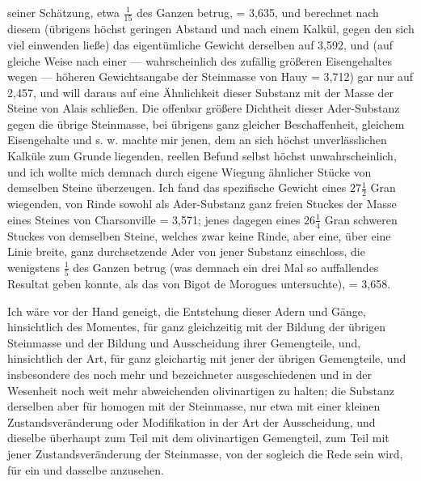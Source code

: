 \documentclass[a4paper, 11pt, oneside, german]{article}
\begin{document}
{seiner Schätzung, etwa $\frac{1}{15}$ des Ganzen betrug, = 3,635, und berechnet nach diesem (übrigens höchst geringen Abstand und nach einem Kalkül, gegen den sich viel einwenden ließe) das eigentümliche Gewicht derselben auf 3,592, und (auf gleiche Weise nach einer --- wahrscheinlich des zufällig größeren Eisengehaltes wegen --- höheren Gewichtsangabe der Steinmasse von Hauy = 3,712) gar nur auf 2,457, und will daraus auf eine Ähnlichkeit dieser Substanz mit der Masse der Steine von Alais schließen. Die offenbar größere Dichtheit dieser Ader-Substanz gegen die übrige Steinmasse, bei übrigens ganz gleicher Beschaffenheit, gleichem Eisengehalte und s. w. machte mir jenen, dem an sich höchst unverlässlichen Kalküle zum Grunde liegenden, reellen Befund selbst höchst unwahrscheinlich, und ich wollte mich demnach durch eigene Wiegung ähnlicher Stücke von demselben Steine überzeugen. Ich fand das spezifische Gewicht eines $27\frac{1}{2}$ Gran wiegenden, von Rinde sowohl als Ader-Substanz ganz freien Stuckes der Masse eines Steines von Charsonville = 3,571; jenes dagegen eines $26\frac{1}{4}$ Gran schweren Stuckes von demselben Steine, welches zwar keine Rinde, aber eine, über eine Linie breite, ganz durchsetzende Ader von jener Substanz einschloss, die wenigstens $\frac{1}{5}$ des Ganzen betrug (was demnach ein drei Mal so auffallendes Resultat geben konnte, als das von Bigot de Morogues untersuchte), = 3,658.}

Ich wäre vor der Hand geneigt, die Entstehung dieser Adern und Gänge, hinsichtlich des Momentes, für ganz gleichzeitig mit der Bildung der übrigen Steinmasse und der Bildung und Ausscheidung ihrer Gemengteile, und, hinsichtlich der Art, für ganz gleichartig mit jener der übrigen Gemengteile, und insbesondere des noch mehr und bezeichneter ausgeschiedenen und in der Wesenheit noch weit mehr abweichenden olivinartigen zu halten; die Substanz derselben aber für homogen mit der Steinmasse, nur etwa mit einer kleinen Zustandsveränderung oder Modifikation in der Art der Ausscheidung, und dieselbe überhaupt zum Teil mit dem olivinartigen Gemengteil, zum Teil mit jener Zustandsveränderung der Steinmasse, von der sogleich die Rede sein wird, für ein und dasselbe anzusehen.
\end{document}
